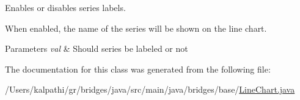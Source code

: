 Enables or disables series labels. 

When enabled, the name of the series will be shown on the line chart.


\begin{DoxyParams}{Parameters}
{\em val} & Should series be labeled or not \\
\hline
\end{DoxyParams}


The documentation for this class was generated from the following file\+:\begin{DoxyCompactItemize}
\item 
/\+Users/kalpathi/gr/bridges/java/src/main/java/bridges/base/\mbox{\hyperlink{_line_chart_8java}{Line\+Chart.\+java}}\end{DoxyCompactItemize}
